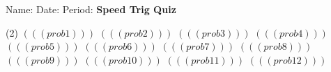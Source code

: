 \documentclass{minimal}
\begin{document}
\noindent Name:\underline{\hspace{5cm}}\hspace{1.25cm}
Date:\underline{\hspace{3cm}}\hspace{1.25cm}
Period:\underline{\hspace{1cm}}
\vspace{15pt}
\newline\textbf{Speed Trig Quiz}\vspace{15pt}
\begin{tasks}(2)
	\task $(((prob1)))$
	\task $(((prob2)))$
	\task $(((prob3)))$
	\task $(((prob4)))$
	\task $(((prob5)))$
	\task $(((prob6)))$
	\task $(((prob7)))$
	\task $(((prob8)))$
	\task $(((prob9)))$
	\task $(((prob10)))$
	\task $(((prob11)))$
	\task $(((prob12)))$
\end{tasks}
\end{document}
